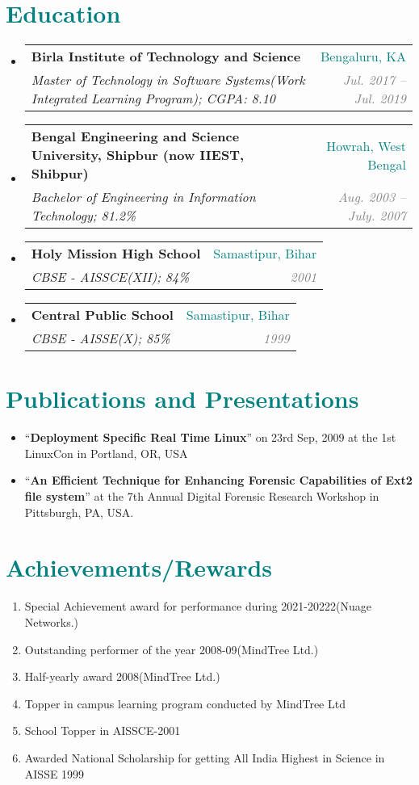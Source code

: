 \documentclass[letterpaper,11pt]{article}
\makeatletter
\newcommand{\resumeSubheading}[4]{
  \vspace{-1pt}\item
    \begin{tabular*}{0.97\textwidth}[t]{l@{\extracolsep{\fill}}r}
      \textbf{#1} & #2 \\
      \textit{\small#3} & \textit{\small #4} \\
    \end{tabular*}\vspace{-5pt}
}
\newcommand{\resumeSubHeadingListStart}{\begin{itemize}[leftmargin=*]}
\newcommand{\resumeSubHeadingListEnd}{\end{itemize}}
\makeatother
\begin{document}
  
\section{\textcolor{teal}{Education}}
  \resumeSubHeadingListStart
    \resumeSubheading
      {Birla Institute of Technology and Science}{\textcolor{teal}{Bengaluru, KA}}
      {Master of Technology in Software Systems(Work Integrated Learning Program);  CGPA: 8.10}{\textcolor{GRAY}{Jul. 2017 -- Jul. 2019}}
    \resumeSubheading
      {Bengal Engineering and Science University, Shipbur (now IIEST, Shibpur)}{\textcolor{teal}{Howrah, West Bengal}}
      {Bachelor of Engineering in Information Technology;  81.2\% }{\textcolor{GRAY}{Aug. 2003 -- July. 2007}}
      \resumeSubheading
      {Holy Mission High School}{\textcolor{teal}{Samastipur, Bihar}}
      {CBSE - AISSCE(XII); 84\%}{\textcolor{GRAY}{2001}}
      \resumeSubheading
      {Central Public School}{\textcolor{teal}{Samastipur, Bihar}}
      {CBSE - AISSE(X); 85\%}{\textcolor{GRAY}{1999}}
  \resumeSubHeadingListEnd

\section{\textcolor{teal}{Publications and Presentations}}
  \resumeSubHeadingListStart
    \item {“\textbf{Deployment Specific Real Time Linux}” on 23rd Sep, 2009 at the 1st LinuxCon in Portland, OR, USA}
    \item  {“\textbf{An Efficient Technique for Enhancing Forensic Capabilities of Ext2 file system}” at the 7th Annual Digital Forensic Research Workshop in Pittsburgh, PA, USA.}
  \resumeSubHeadingListEnd
  
  

\section{\textcolor{teal}{Achievements/Rewards}}
  \begin{enumerate}
    \item{Special Achievement award for performance during 2021-20222(Nuage Networks.)}
    \item{Outstanding performer of the year 2008-09(MindTree Ltd.)}
    \item{Half-yearly award 2008(MindTree Ltd.)}
    \item{Topper in campus learning program conducted by MindTree Ltd}
    \item{School Topper in AISSCE-2001}
    \item{Awarded National Scholarship for getting All India Highest in Science in AISSE 1999}  
    \end{enumerate}


\end{document}
